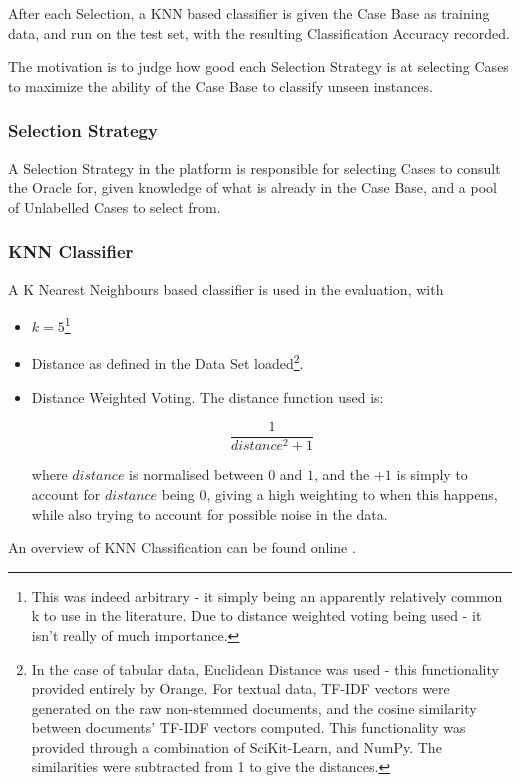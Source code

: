 \documentclass[a4paper,11pt]{report}
\begin{document}
After each Selection, a KNN based classifier is given the Case Base as training data, and run on the test set, with the resulting Classification Accuracy recorded.

The motivation is to judge how good each Selection Strategy is at selecting Cases to maximize the ability of the Case Base to classify unseen instances.

\subsubsection{Selection Strategy}

A Selection Strategy in the platform is responsible for selecting Cases to consult the Oracle for, given knowledge of what is already in the Case Base, and a pool of Unlabelled Cases to select from.

\subsubsection{KNN Classifier}
A K Nearest Neighbours based classifier is used in the evaluation, with 
\begin{itemize}
	\item $k=5$\footnote{This was indeed arbitrary - it simply being an apparently relatively common k to use in the literature. Due to distance weighted voting being used - it isn't really of much importance.} 
	\item Distance as defined in the Data Set loaded\footnote {In the case of tabular data, Euclidean Distance was used - this functionality provided entirely by Orange. For textual data, TF-IDF vectors were generated on the raw non-stemmed documents, and the cosine similarity between documents' TF-IDF vectors computed. This functionality was provided through a combination of SciKit-Learn, and NumPy. The similarities were subtracted from 1 to give the distances. }.
	\item Distance Weighted Voting. The distance function used is:
	
	\[
	\frac{1}{distance^{2}+1}
	\]
	
	where $distance$ is normalised between $0$ and $1$, and the $+1$ is simply to account for $distance$ being $0$, giving a high weighting to when this happens, while also trying to account for possible noise in the data.
	
	
\end{itemize}

An overview of KNN Classification can be found online \citep{web:knntut}.
\end{document}
